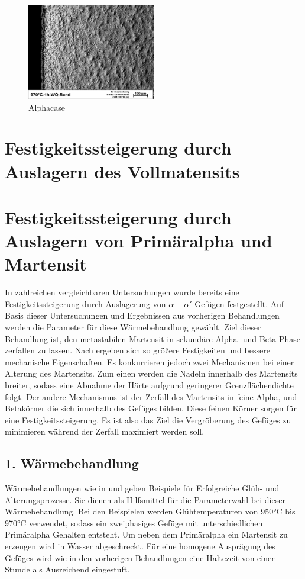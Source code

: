 \documentclass[a4paper, 11pt]{tubsreprt}
\begin{document}
\begin{figure}
\centering
\includegraphics[width=0.5\textwidth]{Bilder/alphacase.jpg}
\caption{Alphacase}
\label{alphacase}
\end{figure}  




\section{Festigkeitssteigerung durch Auslagern des Vollmatensits}
\section{Festigkeitssteigerung durch Auslagern von Primäralpha und Martensit}
In zahlreichen vergleichbaren Untersuchungen wurde bereits eine Festigkeitssteigerung durch Auslagerung von $\alpha + \alpha'$-Gefügen festgestellt. Auf Basis dieser Untersuchungen und Ergebnissen aus vorherigen Behandlungen werden die Parameter für diese Wärmebehandlung gewählt. Ziel dieser Behandlung ist, den metastabilen Martensit in sekundäre Alpha- und Beta-Phase zerfallen zu lassen. Nach \cite{Gilbert2004} ergeben sich so größere Festigkeiten und bessere mechanische Eigenschaften. Es konkurrieren jedoch zwei Mechanismen bei einer Alterung des Martensits. Zum einen werden die Nadeln innerhalb des Martensits breiter, sodass eine Abnahme der Härte aufgrund geringerer Grenzflächendichte folgt. Der andere Mechanismus ist der Zerfall des Martensits in feine Alpha, und Betakörner die sich innerhalb des Gefüges bilden. Diese feinen Körner sorgen für eine Festigkeitssteigerung. Es ist also das Ziel die Vergröberung des Gefüges zu minimieren während der Zerfall maximiert werden soll.
\subsection{1. Wärmebehandlung}
Wärmebehandlungen wie in \cite{Gilbert2004} und \cite{Chen2008} geben Beispiele für Erfolgreiche Glüh- und Alterungsprozesse. Sie dienen als Hilfsmittel für die Parameterwahl bei dieser Wärmebehandlung. Bei den Beispielen werden Glühtemperaturen von 950°C bis 970°C verwendet, sodass ein zweiphasiges Gefüge mit unterschiedlichen Primäralpha Gehalten entsteht. Um neben dem Primäralpha ein Martensit zu erzeugen wird in Wasser abgeschreckt. Für eine homogene Ausprägung des Gefüges wird wie in den vorherigen Behandlungen eine Haltezeit von einer Stunde als Ausreichend eingestuft.
\end{document}

